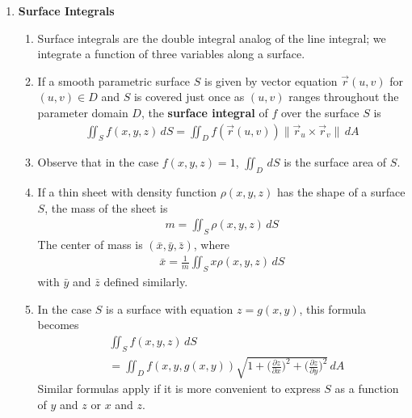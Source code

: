 \documentclass[10pt]{article}
\begin{document}
\begin{multicols}{2}
\begin{enumerate}
    \item \textbf{Surface Integrals}
    \begin{enumerate}
        \item Surface integrals are the double integral analog of the line integral; we integrate a function of three variables along a surface.
        \item If a smooth parametric surface $S$ is given by vector equation $\vec{r}(u,v)$ for $(u,v) \in D$ and $S$ is covered just once as $(u,v)$ ranges throughout the parameter domain $D$, the \textbf{surface integral} of $f$ over the surface $S$ is
        \begin{align*}
            \iint_S f(x,y,z) \,dS = \iint_D f(\vec{r}(u,v)) \| \vec{r}_u \times \vec{r}_v \| \,dA
        \end{align*}
        \item Observe that in the case $f(x,y,z)=1$, $\iint_D \,dS$ is the surface area of $S$.
        \item If a thin sheet with density function $\rho(x,y,z)$ has the shape of a surface $S$, the mass of the sheet is
        \begin{align*}
            m = \iint_S \rho(x,y,z) \,dS
        \end{align*}
        The center of mass is $(\bar{x}, \bar{y}, \bar{z})$, where
        \begin{align*}
            \bar{x} = \frac{1}{m} \iint_S x\rho(x,y,z) \,dS 
        \end{align*}
        with $\bar{y}$ and $\bar{z}$ defined similarly.
        
        \item In the case $S$ is a surface with equation $z=g(x,y)$, this formula becomes
        \begin{align*}
            &\iint_S f(x,y,z) \,dS  \\ &=\iint_D f(x,y,g(x,y)) \sqrt{1 + \biggl( \frac{\partial z}{\partial x} \biggr)^2 + \biggl( \frac{\partial z}{\partial y} \biggr)^2} \,dA
        \end{align*}
        Similar formulas apply if it is more convenient to express $S$ as a function of $y$ and $z$ or $x$ and $z$. 
        

\end{enumerate}
\end{enumerate}
\end{multicols}
\end{document}
